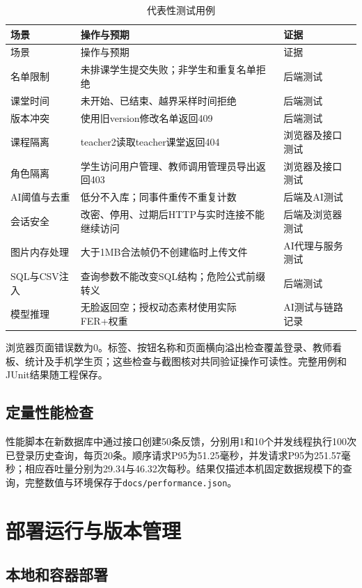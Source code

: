 \documentclass[UTF8,a4paper,zihao=-4,fontset=fandol]{ctexart}
\begin{document}
\begin{longtable}{p{3.5cm}p{6.8cm}p{3.85cm}}
\caption{代表性测试用例}\\
\toprule 场景 & 操作与预期 & 证据\\\midrule\endfirsthead
\toprule 场景 & 操作与预期 & 证据\\\midrule\endhead
名单限制 & 未排课学生提交失败；非学生和重复名单拒绝 & 后端测试\\
课堂时间 & 未开始、已结束、越界采样时间拒绝 & 后端测试\\
版本冲突 & 使用旧version修改名单返回409 & 后端测试\\
课程隔离 & teacher2读取teacher课堂返回404 & 浏览器及接口测试\\
角色隔离 & 学生访问用户管理、教师调用管理员导出返回403 & 浏览器及接口测试\\
AI阈值与去重 & 低分不入库；同事件重传不重复计数 & 后端及AI测试\\
会话安全 & 改密、停用、过期后HTTP与实时连接不能继续访问 & 后端及浏览器测试\\
图片内存处理 & 大于1MB合法帧仍不创建临时上传文件 & AI代理与服务测试\\
SQL与CSV注入 & 查询参数不能改变SQL结构；危险公式前缀转义 & 后端测试\\
模型推理 & 无脸返回空；授权动态素材使用实际FER+权重 & AI测试与链路记录\\
\bottomrule\end{longtable}

浏览器页面错误数为0。标签、按钮名称和页面横向溢出检查覆盖登录、教师看板、统计及手机学生页；这些检查与截图核对共同验证操作可读性。完整用例和JUnit结果随工程保存。

\subsection{定量性能检查}

性能脚本在新数据库中通过接口创建50条反馈，分别用1和10个并发线程执行100次已登录历史查询，每页20条。顺序请求P95为51.25毫秒，并发请求P95为251.57毫秒；相应吞吐量分别为29.34与46.32次每秒。结果仅描述本机固定数据规模下的查询，完整数值与环境保存于\texttt{docs/performance.json}。

\section{部署运行与版本管理}

\subsection{本地和容器部署}
\end{document}
